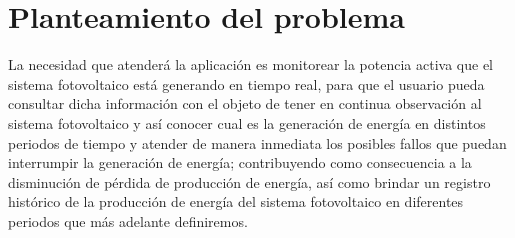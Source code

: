 
\section{Planteamiento del problema}

La necesidad que atenderá la aplicación es monitorear la potencia activa que el sistema fotovoltaico está generando en tiempo real, para que el usuario pueda consultar dicha información con el objeto de tener en continua observación al sistema fotovoltaico y así conocer cual es la generación de energía en distintos periodos de tiempo y atender de manera inmediata los posibles fallos que puedan interrumpir la generación de energía; contribuyendo como consecuencia a la disminución de pérdida de producción de energía, así como brindar un registro histórico de la producción de energía del sistema fotovoltaico en diferentes periodos que más adelante definiremos.

